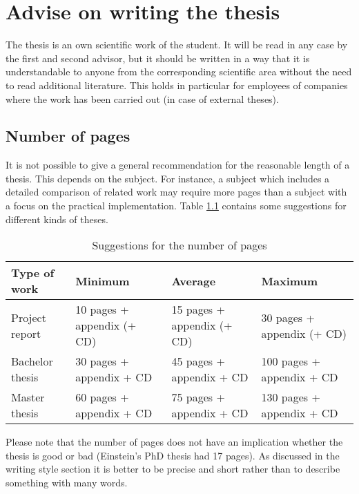 \chapter{Advise on writing the thesis} \label{chap_writing}

The thesis is an own scientific work of the student. It will be read in any case by the first and second advisor, but it should be written in a way that it is understandable to anyone from the corresponding scientific area without the need to read additional literature. This holds in particular for employees of companies where the work has been carried out (in case of external theses).

\section{Number of pages}

It is not possible to give a general recommendation for the reasonable length of a thesis. This depends on the subject. For instance, a subject which includes a detailed comparison of related work may require more pages than a subject with a focus on the practical implementation. Table \ref{tab:pages} contains some suggestions for different kinds of theses.

\begin{table}[htb]
  \centering
  \begin{tabular}{|l|p{3cm}p{3cm}p{3cm}|}
    \hline
    \textbf{Type of work} & \textbf{Minimum} & \textbf{Average} & \textbf{Maximum}\\ \hline
    Project report & 10 pages  + appendix (+ CD) & 15 pages + appendix (+ CD) & 30 pages  + appendix (+ CD)\\ \hline
    Bachelor thesis & 30 pages + appendix + CD & 45 pages + appendix + CD & 100 pages + appendix + CD\\ \hline
		Master thesis & 60 pages + appendix + CD & 75 pages + appendix + CD & 130 pages + appendix + CD \\
    \hline
  \end{tabular}
  \caption{Suggestions for the number of pages}\label{tab:pages}
\end{table}

Please note that the number of pages does not have an implication whether the thesis is good or bad (Einstein's PhD thesis had 17 pages). As discussed in the writing style section it is better to be precise and short rather than to describe something with many words.

